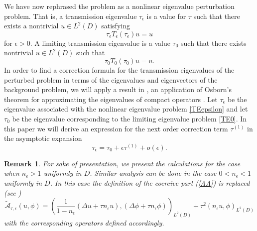 \documentclass[12pt]{article}
\newtheorem{remark}{Remark}
\begin{document}
\noindent
We have now rephrased the problem as a nonlinear eigenvalue perturbation problem. That is, a transmission eigenvalue $\tau_\epsilon$  is a value for $\tau$ such that there exists a nontrivial $u\in L^2(D)$ satisfying
$$\tau_\epsilon T_\epsilon(\tau_\epsilon) u = u$$
for $\epsilon>0$. A limiting transmission eigenvalue is a value $\tau_0$ such that there exists nontrivial $u\in L^2(D)$ such that
$$\tau_0 T_0(\tau_0) u = u.$$
In order to find a correction formula for the transmission eigenvalues of the perturbed problem in terms of the eigenvalues and eigenvectors of the background problem, we will apply a result in \cite{Mo}, an application of Osborn's theorem for approximating the eigenvalues of compact operators \cite{Os}.  
Let $\tau_\epsilon$ be the eigenvalue associated with the nonlinear eigenvalue problem \eqref{TEepsilon}
and let $\tau_0$ be the eigenvalue corresponding to the limiting eigenvalue problem
\eqref{TE0}.
In this paper we will derive an expression for the next order correction term $\tau^{(1)}$ in the asymptotic expansion
\begin{equation*}
\tau_\epsilon = \tau_0+ \epsilon\tau^{(1)} + o(\epsilon ).
\end{equation*} 
\begin{remark}
{\em For sake of presentation, we present the calculations for the case when $n_\epsilon>1$ uniformly in $D$. Similar analysis can be done in the case $0<n_\epsilon<1$ uniformly in $D$. In this case the definition of the coercive part  (\ref{AA}) is replaced  (see \cite[Section 4.2]{CCH-book})
$$
\tilde{\mathcal{A}}_{\tau,\epsilon}(u,\phi)= \left ( 
\frac{1}{1-n_\epsilon}(\Delta u + \tau n_\epsilon u), (\Delta \phi + \tau n_\epsilon  \phi)
\right )_{L^2(D)} + \tau^2 (n_\epsilon u,\phi)_{L^2(D)}
$$
with the corresponding operators defined accordingly.}
\end{remark}
\end{document}
